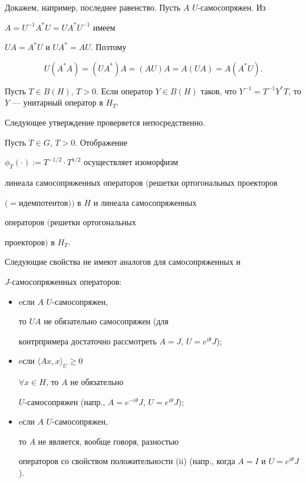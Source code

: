 Докажем, например, последнее равенство. Пусть $A$\; $U$-самосопряжен. Из


$A=U^{-1}A^{*}U=UA^{*}U^{-1}$ имеем


$UA=A^{*}U$ и $UA^{*}=AU$. Поэтому


$$


U(A^{*}A)=(UA^{*})A=(AU)A=A(UA)=A(A^{*}U).


$$


Пусть $T\in B(H)$, $T>0$. Если оператор $Y\in B(H)$ таков, что $Y^{-1}=


T^{-1}Y^{*}T$, то $Y$ --- унитарный оператор в $H_{T}$.





Следующее утверждение проверяется непосредственно.





\begin{prop}


Пусть $T\in G$, $T>0$. Отображение


$\phi_{T}(\cdot):=T^{-1/2}\cdot T^{1/2}$ осуществляет изоморфизм


линеала самосопряженных операторов $($решетки ортогональных проекторов


$({=}$идемпотентов$))$ в $H$ и линеала самосопряженных


операторов $($решетки ортогональных


проекторов$)$ в $H_{T}$.


\end{prop}





Следующие свойства не имеют аналогов для самосопряженных и


$J$-самосопряженных операторов:


\begin{itemize}


\item[(i)] eсли $A$\; $U$-самосопряжен,


то $UA$ не обязательно самосопряжен (для


контрпримера достаточно рассмотреть $A=J$, $U=e^{i\theta}J$);


\item[(ii)] eсли $\langle Ax,x\rangle_{U}\geq 0$


$\forall x\in H$, то $A$ не обязательно


$U$-самосопряжен (напр., $A=e^{-i\theta}J$, $U=e^{i\theta}J$);


\item[(iii)] eсли $A$\; $U$-самосопряжен,


то $A$ не является, вообще говоря, разностью


операторов со свойством положительности (ii) (напр., когда $A=I$ и $U=e^{i


\theta}J$).


\end{itemize}






